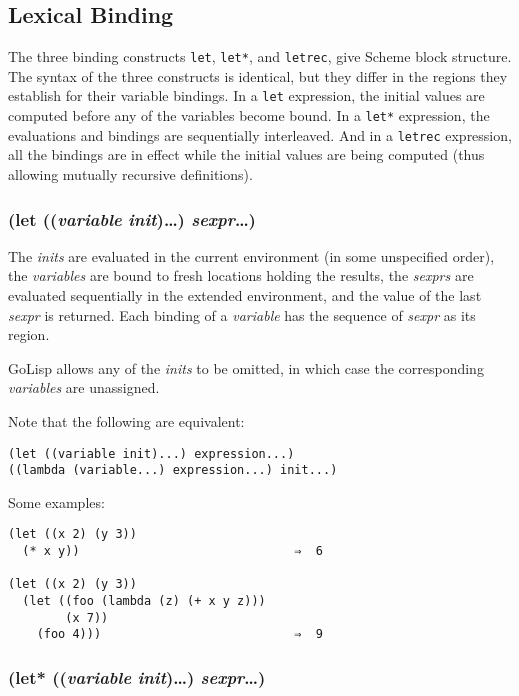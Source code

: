 \documentclass{article}
\begin{document}
\subsection{Lexical Binding}\label{sec:lexical-binding}

The three binding constructs \verb|let|, \verb|let*|, and \verb|letrec|, give Scheme block
structure. The syntax of the three constructs is identical, but they differ in the regions
they establish for their variable bindings. In a \verb|let| expression, the initial values are
computed before any of the variables become bound. In a \verb|let*| expression, the
evaluations and bindings are sequentially interleaved. And in a \verb|letrec| expression, all
the bindings are in effect while the initial values are being computed (thus allowing mutually
recursive definitions).

\subsubsection{(let ((\emph{variable} \emph{init})\ldots{}) \emph{sexpr}\ldots{})}

The \emph{inits} are evaluated in the current environment (in some unspecified order), the
\emph{variables} are bound to fresh locations holding the results, the \emph{sexprs} are
evaluated sequentially in the extended environment, and the value of the last \emph{sexpr} is
returned. Each binding of a \emph{variable} has the sequence of \emph{sexpr} as its region.

GoLisp allows any of the \emph{inits} to be omitted, in which case the corresponding
\emph{variables} are unassigned.

Note that the following are equivalent:

\begin{verbatim}
(let ((variable init)...) expression...)
((lambda (variable...) expression...) init...)
\end{verbatim}

Some examples:

\begin{verbatim}
(let ((x 2) (y 3))
  (* x y))                              ⇒  6

(let ((x 2) (y 3))
  (let ((foo (lambda (z) (+ x y z)))
        (x 7))
    (foo 4)))                           ⇒  9
\end{verbatim}

\subsubsection{(let* ((\emph{variable} \emph{init})\ldots{}) \emph{sexpr}\ldots{})}
\end{document}
